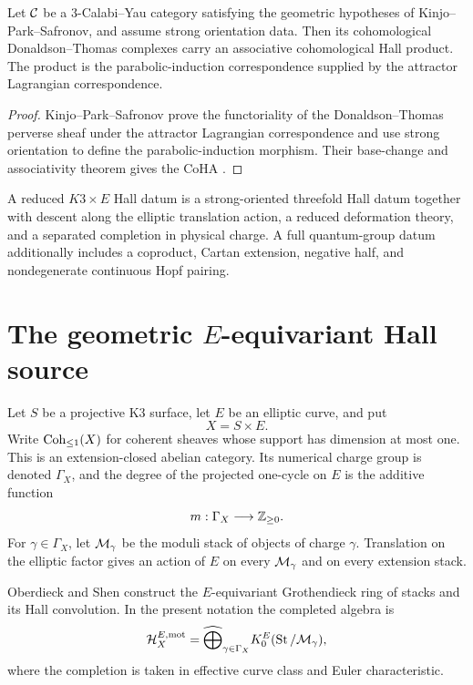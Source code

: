 \begin{theorem}
Let $\mathcal C$ be a $3$-Calabi--Yau category satisfying the geometric hypotheses of Kinjo--Park--Safronov, and assume strong orientation data.  Then its cohomological Donaldson--Thomas complexes carry an associative cohomological Hall product.  The product is the parabolic-induction correspondence supplied by the attractor Lagrangian correspondence.
\end{theorem}
\begin{proof}
Kinjo--Park--Safronov prove the functoriality of the Donaldson--Thomas perverse sheaf under the attractor Lagrangian correspondence and use strong orientation to define the parabolic-induction morphism.  Their base-change and associativity theorem gives the CoHA \cite{KPS}.
\end{proof}

\begin{definition}
A reduced $K3\times E$ Hall datum is a strong-oriented threefold Hall datum together with descent along the elliptic translation action, a reduced deformation theory, and a separated completion in physical charge.  A full quantum-group datum additionally includes a coproduct, Cartan extension, negative half, and nondegenerate continuous Hopf pairing.
\end{definition}

\chapter{The geometric \texorpdfstring{$E$}{E}-equivariant Hall source}
Let $S$ be a projective K3 surface, let $E$ be an elliptic curve, and put
\[
 X=S\times E.
\]
Write $\operatorname{Coh}_{\leq1}(X)$ for coherent sheaves whose support has dimension at most one.  This is an extension-closed abelian category.  Its numerical charge group is denoted $\Gamma_X$, and the degree of the projected one-cycle on $E$ is the additive function
\[
 m:\Gamma_X\longrightarrow\mathbb Z_{\geq0}.
\]
For $\gamma\in\Gamma_X$, let $\mathcal M_\gamma$ be the moduli stack of objects of charge $\gamma$.  Translation on the elliptic factor gives an action of $E$ on every $\mathcal M_\gamma$ and on every extension stack.

Oberdieck and Shen construct the $E$-equivariant Grothendieck ring of stacks and its Hall convolution.  In the present notation the completed algebra is
\[
 \mathcal H_X^{E,\mathrm{mot}}
 =\widehat\bigoplus_{\gamma\in\Gamma_X}
 K_0^E(\operatorname{St}/\mathcal M_\gamma),
\]
where the completion is taken in effective curve class and Euler characteristic.

